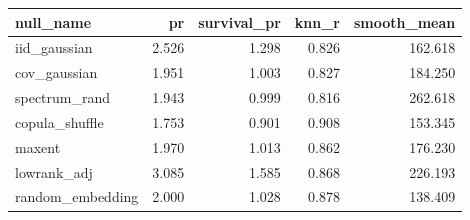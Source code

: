 \begin{tabular}{lrrrr}
\toprule
null_name & pr & survival_pr & knn_r & smooth_mean \\
\midrule
iid_gaussian & 2.526 & 1.298 & 0.826 & 162.618 \\
cov_gaussian & 1.951 & 1.003 & 0.827 & 184.250 \\
spectrum_rand & 1.943 & 0.999 & 0.816 & 262.618 \\
copula_shuffle & 1.753 & 0.901 & 0.908 & 153.345 \\
maxent & 1.970 & 1.013 & 0.862 & 176.230 \\
lowrank_adj & 3.085 & 1.585 & 0.868 & 226.193 \\
random_embedding & 2.000 & 1.028 & 0.878 & 138.409 \\
\bottomrule
\end{tabular}
